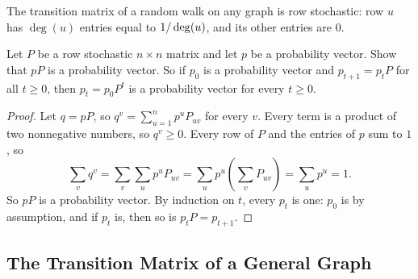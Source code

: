 The transition matrix of a random walk on any graph is row stochastic: row $u$ has $\deg(u)$ entries
equal to $1/\deg(u)$, and its other entries are $0$.

\begin{exercisebox}
\begin{exercise}\label{ex:probvec-0910}\label{thm:probvec-0910}
    Let $P$ be a row stochastic $n \times n$ matrix and let $p$ be a probability vector. Show that
    $pP$ is a probability vector. So if $p_0$ is a probability vector and $p_{t+1} = p_t P$ for all
    $t \geq 0$, then $p_t = p_0 P^t$ is a probability vector for every $t \geq 0$.
\end{exercise}
\tcblower
\begin{proof}
    Let $q = pP$, so $q^v = \sum_{u=1}^{n} p^u P_{uv}$ for every $v$. Every term is a product of
    two nonnegative numbers, so $q^v \geq 0$. Every row of $P$ and the entries of $p$ sum to $1$, so
    \[\sum_{v} q^v = \sum_{v} \sum_{u} p^u P_{uv} = \sum_{u} p^u \left(\sum_{v} P_{uv}\right)
        = \sum_{u} p^u = 1.\]
    So $pP$ is a probability vector. By induction on $t$, every $p_t$ is one: $p_0$ is by
    assumption, and if $p_t$ is, then so is $p_t P = p_{t+1}$.
\end{proof}
\end{exercisebox}

\subsection{The Transition Matrix of a General Graph}

